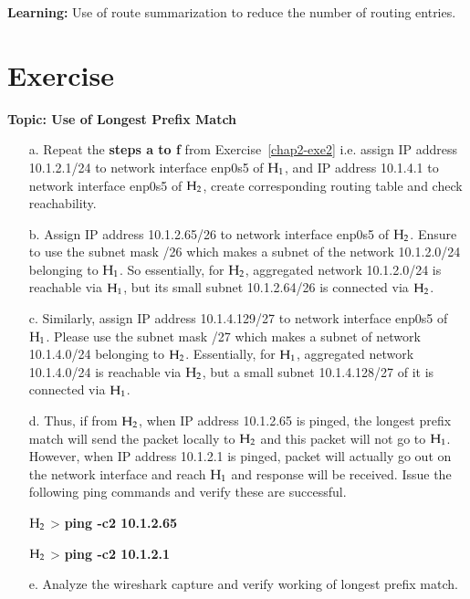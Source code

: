 \begin{multicols}{2}
\textbf{Learning:} Use of route summarization to reduce the number of routing entries.

\section*{Exercise \label{chap2-exe4}}

\textbf{Topic: Use of Longest Prefix Match}

\begin{itemize}
\item[a.] Repeat the \textbf{steps a to f} from  Exercise~\ref{chap2-exe2} i.e. assign IP address 10.1.2.1/24 to network interface enp0s5 of ${\rm H}_{1}$, and IP address 10.1.4.1 to network interface enp0s5 of ${\rm H}_{2}$, create corresponding routing table and check reachability.

\item[b.] Assign IP address 10.1.2.65/26 to network interface enp0s5 of ${\rm H}_{2}$. Ensure to use the subnet mask /26 which makes a subnet of the network 10.1.2.0/24 belonging to ${\rm H}_{1}$. So essentially, for ${\rm H}_{2}$, aggregated network 10.1.2.0/24 is reachable via ${\rm H}_{1}$, but its small subnet 10.1.2.64/26 is connected via ${\rm H}_{2}$.

\item[c.] Similarly, assign IP address 10.1.4.129/27 to network interface enp0s5 of ${\rm H}_{1}$. Please use the subnet mask /27 which makes a subnet of network 10.1.4.0/24 belonging to ${\rm H}_{2}$. Essentially, for ${\rm H}_{1}$, aggregated network 10.1.4.0/24 is reachable via ${\rm H}_{2}$, but a small subnet 10.1.4.128/27 of it is connected via ${\rm H}_{1}$.

\item[d.] Thus, if from ${\rm H}_{2}$, when IP address 10.1.2.65 is pinged, the longest prefix match will send the packet locally to ${\rm H}_{2}$ and this packet will not go to ${\rm H}_{1}$. However, when IP address 10.1.2.1 is pinged, packet will actually go out on the network interface and reach ${\rm H}_{1}$ and response will be received. Issue the following ping commands and verify these are successful.

${\rm H}_{2}$ > \textbf{ping -c2 10.1.2.65}

${\rm H}_{2}$ > \textbf{ping -c2 10.1.2.1}

\item[e.] Analyze the wireshark capture and verify working of longest prefix match.


\end{itemize}
\end{multicols}
